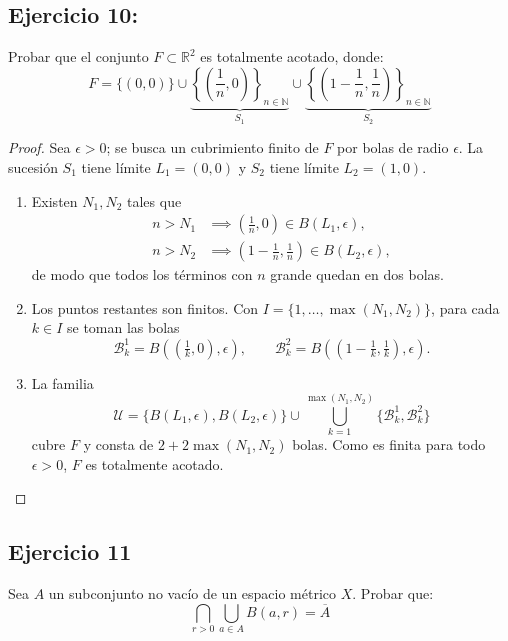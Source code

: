 \documentclass[11pt, a4paper]{article}
\begin{document}
\subsection*{Ejercicio 10:}

Probar que el conjunto $F \subset \mathbb{R}^2$ es totalmente acotado, donde:
$$ F = \{(0,0)\} \cup \underbrace{\left\{ \left(\frac{1}{n}, 0\right) \right\}_{n \in
\mathbb{N}}}_{S_1} \cup \underbrace{\left\{ \left(1-\frac{1}{n}, \frac{1}{n}\right) \right\}_{n \in
\mathbb{N}}}_{S_2} $$

\begin{proof}
Sea $\epsilon > 0$; se busca un cubrimiento finito de $F$ por bolas de radio $\epsilon$. La sucesión
$S_1$ tiene límite $L_1 = (0,0)$ y $S_2$ tiene límite $L_2 = (1,0)$.
\begin{enumerate}
    \item Existen $N_1, N_2$ tales que
    \begin{align*}
        n > N_1 &\implies \left(\tfrac{1}{n}, 0\right) \in B(L_1, \epsilon), \\
        n > N_2 &\implies \left(1-\tfrac{1}{n}, \tfrac{1}{n}\right) \in B(L_2, \epsilon),
    \end{align*}
    de modo que todos los términos con $n$ grande quedan en dos bolas.
    \item Los puntos restantes son finitos. Con $I = \{1, \dots, \max(N_1, N_2)\}$, para cada
    $k \in I$ se toman las bolas
    $$ \mathcal{B}_k^1 = B\!\left( \left(\tfrac{1}{k}, 0\right), \epsilon \right), \qquad
    \mathcal{B}_k^2 = B\!\left( \left(1-\tfrac{1}{k}, \tfrac{1}{k}\right), \epsilon \right). $$
    \item La familia
    $$ \mathcal{U} = \{ B(L_1, \epsilon), B(L_2, \epsilon) \} \cup \bigcup_{k=1}^{\max(N_1, N_2)}
    \{ \mathcal{B}_k^1, \mathcal{B}_k^2 \} $$
    cubre $F$ y consta de $2 + 2\max(N_1, N_2)$ bolas. Como es finita para todo $\epsilon > 0$, $F$
    es totalmente acotado.
\end{enumerate}
\end{proof}

\subsection*{Ejercicio 11}

Sea $A$ un subconjunto no vacío de un espacio métrico $X$. Probar que:
$$ \bigcap_{r>0} \bigcup_{a \in A} B(a,r) = \overline{A} $$
\end{document}
